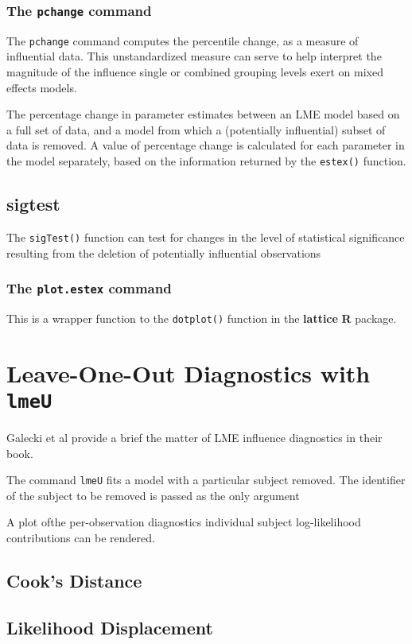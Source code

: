\documentclass{article}
\begin{document}



\subsubsection*{The \texttt{pchange} command}

The \texttt{pchange} command computes the percentile change, as a measure of influential data. This unstandardized measure can
serve to help interpret the magnitude of the influence single or combined grouping levels exert on
mixed effects models. 

The percentage change in parameter estimates between an LME model based on a full set of data, and a model from which a (potentially influential)
subset of data is removed. A value of percentage change is calculated for each parameter in the
model separately, based on the information returned by the \texttt{estex()} function.

\subsection*{sigtest}

The \texttt{sigTest()} function can test for changes in the level of statistical significance resulting from
the deletion of potentially influential observations


\subsubsection*{The \texttt{plot.estex} command}
This is a wrapper function to the \texttt{dotplot()} function in the \textbf{lattice} \textbf{R} package.

\newpage

\section{Leave-One-Out Diagnostics with \texttt{lmeU}}
Galecki et al provide a brief the matter of LME influence diagnostics in their book.

The command \texttt{lmeU} fits a model with a particular subject removed. The identifier of the subject to be removed is passed as the only argument

A plot ofthe per-observation diagnostics individual subject log-likelihood contributions can be rendered.

\subsection{Cook's Distance}
\subsection{Likelihood Displacement}
\end{document}
